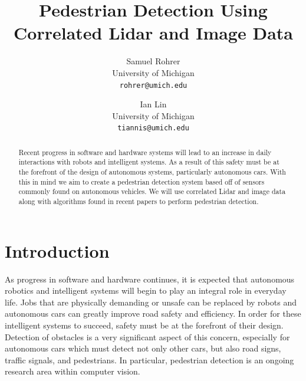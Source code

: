 \documentclass[10pt,twocolumn,letterpaper]{article}
\begin{document}
\title{Pedestrian Detection Using Correlated Lidar and Image Data}

\author{Samuel Rohrer\\
University of Michigan\\
{\tt\small rohrer@umich.edu}
\and
Ian Lin\\
University of Michigan\\
{\tt\small tiannis@umich.edu}
}

\maketitle

\begin{abstract}
  Recent progress in software and hardware systems will lead to an increase in
  daily interactions with robots and intelligent systems. As a result of this 
  safety must be at the forefront of the design of autonomous systems, 
  particularly autonomous cars. With this in mind we aim to create a pedestrian
  detection system based off of sensors commonly found on autonomous vehicles.
  We will use correlated Lidar and image data along with algorithms found in 
  recent papers to perform pedestrian detection.

\end{abstract}

\section{Introduction}

  As progress in software and hardware continues, it is expected that 
  autonomous robotics and intelligent systems will begin to play an integral 
  role in everyday life. Jobs that are physically demanding or unsafe can be 
  replaced by robots and autonomous cars can greatly improve road safety and
  efficiency. In order for these intelligent systems to succeed, safety must 
  be at the forefront of their design. Detection of obstacles is a very
  significant aspect of this concern, especially for autonomous cars which
  must detect not only other cars, but also road signs, traffic signals, and
  pedestrians. In particular, pedestrian detection is an ongoing research
  area within computer vision.
\end{document}
